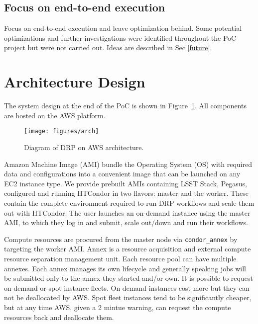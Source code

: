 \subsection{Focus on end-to-end execution}

Focus on end-to-end execution and leave optimization behind.
Some potential optimizations and further investigations were identified throughout the PoC project but were not carried out.
Ideas are described in Sec \ref{future}.


\section{Architecture Design}

The system design at the end of the PoC is shown in Figure~\ref{fig:arch}.
All components are hosted on the AWS platform.

\begin{figure}
  \centering
  \texttt{[image: figures/arch]}
  \label{fig:arch}
  \caption{Diagram of DRP on AWS architecture.}
\end{figure}

Amazon Machine Image (AMI) bundle the Operating System (OS) with required data and configurations into a convenient image that can be launched on any EC2 instance type. We provide prebuilt AMIs containing LSST Stack, Pegasus, configured and running HTCondor in two flavors: master and the worker. These contain the complete environment required to run DRP workflows and scale them out with HTCondor. The user launches an on-demand instance using the master AMI, to which they log in and submit, scale out/down and run their workflows. 

Compute resources are procured from the master node via \texttt{condor\_annex} by targeting the worker AMI. Annex is a resource acquisition and external compute resource separation management unit. Each resource pool can have multiple annexes. Each annex manages its own lifecycle and generally speaking jobs will be submitted only to the annex they started and/or own. It is possible to request on-demand or spot instance fleets. On demand instances cost more but they can not be deallocated by AWS. Spot fleet instances tend to be significantly cheaper, but at any time AWS, given a 2 mintue warning, can request the compute resources back and deallocate them.


